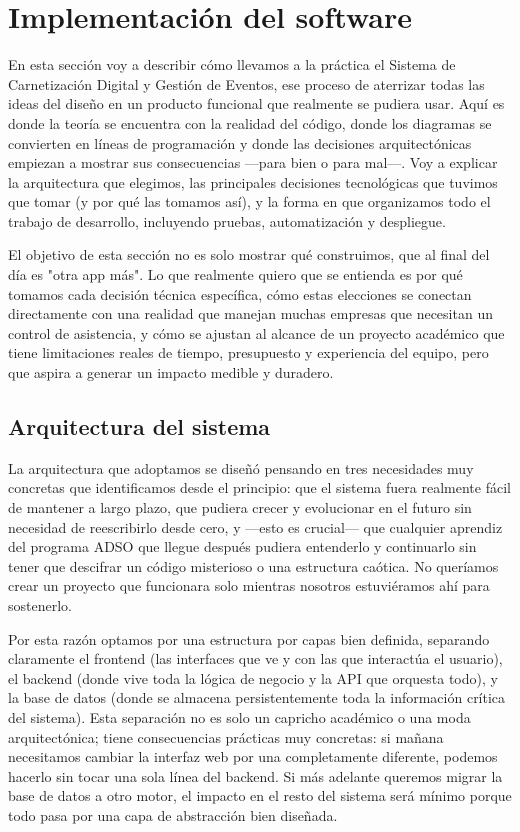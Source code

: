 \section{Implementación del software}

En esta sección voy a describir cómo llevamos a la práctica el Sistema de Carnetización Digital y Gestión de Eventos, ese proceso de aterrizar todas las ideas del diseño en un producto funcional que realmente se pudiera usar. Aquí es donde la teoría se encuentra con la realidad del código, donde los diagramas se convierten en líneas de programación y donde las decisiones arquitectónicas empiezan a mostrar sus consecuencias —para bien o para mal—. Voy a explicar la arquitectura que elegimos, las principales decisiones tecnológicas que tuvimos que tomar (y por qué las tomamos así), y la forma en que organizamos todo el trabajo de desarrollo, incluyendo pruebas, automatización y despliegue.

El objetivo de esta sección no es solo mostrar qué construimos, que al final del día es "otra app más". Lo que realmente quiero que se entienda es por qué tomamos cada decisión técnica específica, cómo estas elecciones se conectan directamente con una realidad que manejan muchas empresas que necesitan un control de asistencia, y cómo se ajustan al alcance de un proyecto académico que tiene limitaciones reales de tiempo, presupuesto y experiencia del equipo, pero que aspira a generar un impacto medible y duradero.

\subsection{Arquitectura del sistema}

La arquitectura que adoptamos se diseñó pensando en tres necesidades muy concretas que identificamos desde el principio: que el sistema fuera realmente fácil de mantener a largo plazo, que pudiera crecer y evolucionar en el futuro sin necesidad de reescribirlo desde cero, y —esto es crucial— que cualquier aprendiz del programa ADSO que llegue después pudiera entenderlo y continuarlo sin tener que descifrar un código misterioso o una estructura caótica. No queríamos crear un proyecto que funcionara solo mientras nosotros estuviéramos ahí para sostenerlo.

Por esta razón optamos por una estructura por capas bien definida, separando claramente el frontend (las interfaces que ve y con las que interactúa el usuario), el backend (donde vive toda la lógica de negocio y la API que orquesta todo), y la base de datos (donde se almacena persistentemente toda la información crítica del sistema). Esta separación no es solo un capricho académico o una moda arquitectónica; tiene consecuencias prácticas muy concretas: si mañana necesitamos cambiar la interfaz web por una completamente diferente, podemos hacerlo sin tocar una sola línea del backend. Si más adelante queremos migrar la base de datos a otro motor, el impacto en el resto del sistema será mínimo porque todo pasa por una capa de abstracción bien diseñada.

